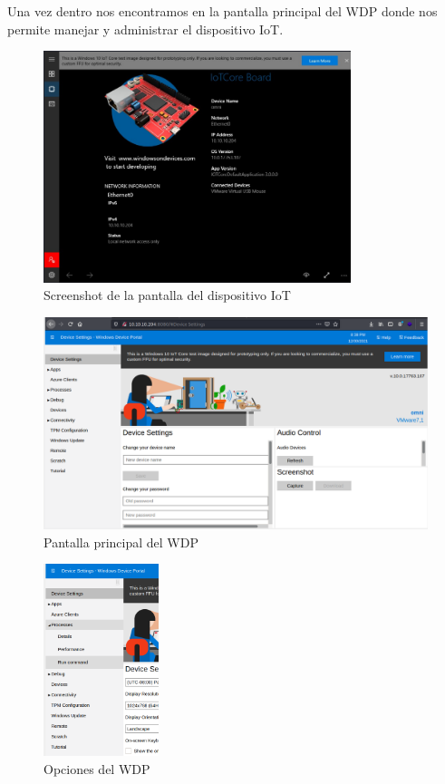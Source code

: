 \documentclass{article}
\begin{document}
Una vez dentro nos encontramos en la pantalla principal del WDP donde nos permite manejar y administrar el dispositivo IoT.
\begin{figure}[H]
	\center
	\includegraphics[width=0.8\textwidth]{images/omni/18.png}
	\caption{Screenshot de la pantalla del dispositivo IoT}
\end{figure}
\begin{figure}[H]
	\center
	\includegraphics[width=\textwidth]{images/omni/19.png}
	\caption{Pantalla principal del WDP}
\end{figure}
\begin{figure}[H]
	\center
	\includegraphics[width=0.3\textwidth]{images/omni/20.png}
	\caption{Opciones del WDP}
\end{figure}
\end{document}

